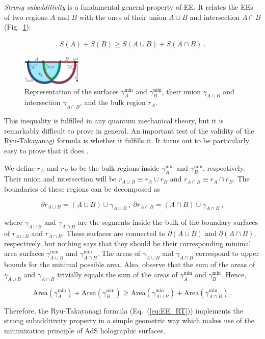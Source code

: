 \documentclass[twocolumn]{revtex4}
\providecommand{\eq}[2]{
    \begin{equation}
        #2
    \label{eq:#1}
    \end{equation}
}
\providecommand{\eqgat}[2]{
    \begin{gather}
        #2
    \label{eq:#1}
    \end{gather}
}
\begin{document}
\emph{Strong subadditivity}  is a fundamental general property of EE. It relates the EEs of two regions $A$ and $B$ with the ones of their union $A \cup B$ and intersection $A \cap B$ %
(Fig.~\ref{fig:SS}):
\eqgat{EE_strong-subadd}{
    S(A) + S(B) \ge S(A \cup B) + S(A \cap B) \ . %
}
\begin{figure}
    \centering
    \includegraphics[width=0.25\textwidth]{../../../Imatges/SS_2-D.png}
\caption{Representation of the surfaces $\gamma_A^\text{min}$ and $\gamma_B^\text{min}$, their union $\gamma_{A \cup B}$ and intersection $\gamma_{A \cap B}$, and the bulk region $r_A$.}
\label{fig:SS}
\end{figure}
This inequality is fulfilled in any quantum mechanical theory, but it is remarkably difficult to prove in general. An important test of the validity of the Ryu-Takayanagi formula is whether it fulfills it. It turns out to be particularly easy to prove that it does \cite{headrick_holographic_2007}.

We define $r_A$ and $r_B$ to be the bulk regions inside $\gamma^{\text{min}}_A$ and $\gamma^{\text{min}}_B$, respectively. Their union and intersection will be $r_{A \cup B} \equiv  r_A \cup r_B$ and $r_{A \cap B} \equiv  r_A \cap r_B$. The boundaries of these regions can be decomposed as
\eq{SS_dr-1}{
    \partial r_{A \cup B} = (A \cup B) \cup \gamma_{A \cup B} \ , \ \partial r_{A \cap B } = (A \cap B) \cup \gamma_{A \cap B} \ , \nonumber
}
where $\gamma_{A \cup B}$ and $\gamma_{A \cap B}$ are the segments inside the bulk of the boundary surfaces of $r_{A \cup B}$ and $r_{A \cap B}$. These surfaces are connected to $\partial (A \cup B)$ and $\partial (A \cap B)$, respectively, but nothing says that they should be their corresponding minimal area surfaces $\gamma^{\text{min}}_{A \cup B}$ and $\gamma^{\text{min}}_{A \cap B}$. The areas of $\gamma_{A \cup B}$ and $\gamma_{A \cap B}$ correspond to upper bounds for the minimal possible area. Also, observe that the sum of the areas of $\gamma_{A \cup B}$ and $\gamma_{A \cap B}$ trivially equals the sum of the areas of $\gamma^{\text{min}}_A$ and $\gamma^{\text{min}}_B$. Hence,
\eq{SS_gamma-1}{
    {\text{Area}}(\gamma^{\text{min}}_A) + {\text{Area}}(\gamma^{\text{min}}_B) %
    \ge   {\text{Area}}(\gamma^{\text{min}}_{A \cup B}) +   {\text{Area}}(\gamma^{\text{min}}_{A \cap B}) \ . \nonumber
}
Therefore, the Ryu-Takayanagi formula (Eq.~(\ref{eq:EE_RT})) implements the strong subadditivity property in a simple geometric way which makes use of the minimization principle of AdS holographic surfaces. %
\end{document}
